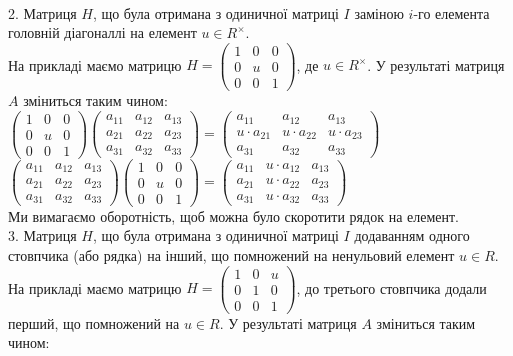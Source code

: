 \documentclass[a4paper, 10pt]{article}
\theoremstyle{theoremdd}
\theoremstyle{theoremdd}
\theoremstyle{theoremdd}
\theoremstyle{theoremdd}
\theoremstyle{theoremdd}
\theoremstyle{theoremdd}
\theoremstyle{theoremdd}
\theoremstyle{theoremdd}
\theoremstyle{theoremdd}
\theoremstyle{theoremdd}
\theoremstyle{theoremdd}
\theoremstyle{theoremdd}
\theoremstyle{theoremdd}
\theoremstyle{theoremdd}
\theoremstyle{theoremdd}
\begin{document}
\bigskip \\
2. Матриця $H$, що була отримана з одиничної матриці $I$ заміною $i$-го елемента головній діагоналлі на елемент $u \in R^\times$.\\
На прикладі маємо матрицю $H = \begin{pmatrix}
1 & 0 & 0 \\
0 & u & 0 \\
0 & 0 & 1
\end{pmatrix}$, де $u \in R^\times$. У результаті матриця $A$ зміниться таким чином: \\
$\begin{pmatrix}
1 & 0 & 0 \\
0 & u & 0 \\
0 & 0 & 1
\end{pmatrix} \begin{pmatrix}
a_{11} & a_{12} & a_{13} \\
a_{21} & a_{22} & a_{23} \\
a_{31} & a_{32} & a_{33} 
\end{pmatrix} = \begin{pmatrix}
a_{11} & a_{12} & a_{13} \\
u \cdot a_{21} & u \cdot a_{22} & u \cdot a_{23} \\
a_{31} & a_{32} & a_{33} 
\end{pmatrix}$\\
$\begin{pmatrix}
a_{11} & a_{12} & a_{13} \\
a_{21} & a_{22} & a_{23} \\
a_{31} & a_{32} & a_{33} 
\end{pmatrix} \begin{pmatrix}
1 & 0 & 0 \\
0 & u & 0 \\
0 & 0 & 1
\end{pmatrix} = \begin{pmatrix}
a_{11} & u \cdot a_{12} & a_{13} \\
a_{21} & u \cdot a_{22} & a_{23} \\
a_{31} & u \cdot a_{32} & a_{33} 
\end{pmatrix}$\\
Ми вимагаємо оборотність, щоб можна було скоротити рядок на елемент.
\bigskip \\
3. Матриця $H$, що була отримана з одиничної матриці $I$ додаванням одного стовпчика (або рядка) на інший, що помножений на ненульовий елемент $u \in R$.\\
На прикладі маємо матрицю $H = \begin{pmatrix}
1 & 0 & u \\
0 & 1 & 0 \\
0 & 0 & 1
\end{pmatrix}$, до третього стовпчика додали перший, що помножений на $u \in R$. У результаті матриця $A$ зміниться таким чином:\\
\end{document}
